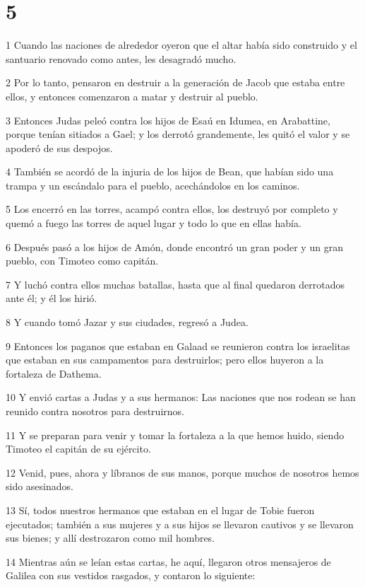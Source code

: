 \chapter{5}

\par 1 Cuando las naciones de alrededor oyeron que el altar había sido construido y el santuario renovado como antes, les desagradó mucho.
\par 2 Por lo tanto, pensaron en destruir a la generación de Jacob que estaba entre ellos, y entonces comenzaron a matar y destruir al pueblo.
\par 3 Entonces Judas peleó contra los hijos de Esaú en Idumea, en Arabattine, porque tenían sitiados a Gael; y los derrotó grandemente, les quitó el valor y se apoderó de sus despojos.
\par 4 También se acordó de la injuria de los hijos de Bean, que habían sido una trampa y un escándalo para el pueblo, acechándolos en los caminos.
\par 5 Los encerró en las torres, acampó contra ellos, los destruyó por completo y quemó a fuego las torres de aquel lugar y todo lo que en ellas había.
\par 6 Después pasó a los hijos de Amón, donde encontró un gran poder y un gran pueblo, con Timoteo como capitán.
\par 7 Y luchó contra ellos muchas batallas, hasta que al final quedaron derrotados ante él; y él los hirió.
\par 8 Y cuando tomó Jazar y sus ciudades, regresó a Judea.
\par 9 Entonces los paganos que estaban en Galaad se reunieron contra los israelitas que estaban en sus campamentos para destruirlos; pero ellos huyeron a la fortaleza de Dathema.
\par 10 Y envió cartas a Judas y a sus hermanos: Las naciones que nos rodean se han reunido contra nosotros para destruirnos.
\par 11 Y se preparan para venir y tomar la fortaleza a la que hemos huido, siendo Timoteo el capitán de su ejército.
\par 12 Venid, pues, ahora y líbranos de sus manos, porque muchos de nosotros hemos sido asesinados.
\par 13 Sí, todos nuestros hermanos que estaban en el lugar de Tobie fueron ejecutados; también a sus mujeres y a sus hijos se llevaron cautivos y se llevaron sus bienes; y allí destrozaron como mil hombres.
\par 14 Mientras aún se leían estas cartas, he aquí, llegaron otros mensajeros de Galilea con sus vestidos rasgados, y contaron lo siguiente:
